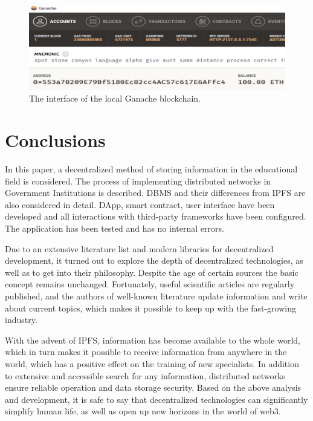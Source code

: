 \documentclass[10pt,conference,a4paper]{IEEEtran_EDM}
\begin{document}
\begin{figure}[htbp]
\centerline{\includegraphics[scale=0.51]{fig3.png}}
\caption{The interface of the local Ganache blockchain.}
\label{GanacheB}
\end{figure}

\section{Conclusions }
In this paper, a decentralized method of storing information in the educational field is considered.
The process of implementing distributed networks in Government Institutions is described.
DBMS and their differences from IPFS are also considered in detail.
DApp, smart contract, user interface have been developed and all interactions with third-party frameworks have been configured.
The application has been tested and has no internal errors.

Due to an extensive literature list and modern libraries for decentralized development, it turned out to explore the depth of decentralized technologies, as well as to get into their philosophy.
Despite the age of certain sources the basic concept remains unchanged.
Fortunately, useful scientific articles are regularly published, and the authors of well-known literature update information and write about current topics, which makes it possible to keep up with the fast-growing industry.

With the advent of IPFS, information has become available to the whole world, which in turn makes it possible to receive information from anywhere in the world, which has a positive effect on the training of new specialists.
In addition to extensive and accessible search for any information, distributed networks ensure reliable operation and data storage security.
Based on the above analysis and development, it is safe to say that decentralized technologies can significantly simplify human life, as well as open up new horizons in the world of web3.
\end{document}
